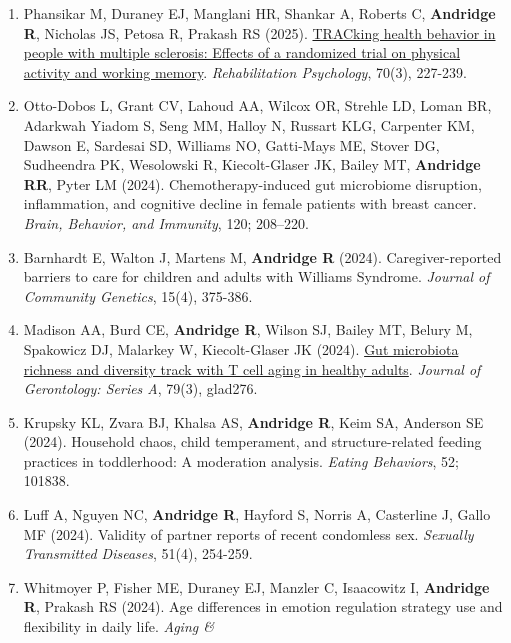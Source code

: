 \documentclass[
  english,
  letterpaper,
  DIV=11,
  numbers=noendperiod]{scrartcl}
\begin{document}
\begin{enumerate}
  \href{https://doi.org/10.1016/j.pedhc.2024.07.003}{Screen time,
  outdoor play, and sleep routines in early childhood: Longitudinal
  associations with parenting stress during toddler years}.
  \emph{Journal of Pediatric Health Care}, 38(6); 794-803.
\item
  Phansikar M, Duraney EJ, Manglani HR, Shankar A, Roberts C,
  \textbf{Andridge R}, Nicholas JS, Petosa R, Prakash RS (2025).
  \href{https://doi.org/10.1037/rep0000578}{TRACking health behavior in
  people with multiple sclerosis: Effects of a randomized trial on
  physical activity and working memory}. \emph{Rehabilitation
  Psychology}, 70(3), 227-239.
\item
  Otto-Dobos L, Grant CV, Lahoud AA, Wilcox OR, Strehle LD, Loman BR,
  Adarkwah Yiadom S, Seng MM, Halloy N, Russart KLG, Carpenter KM,
  Dawson E, Sardesai SD, Williams NO, Gatti-Mays ME, Stover DG,
  Sudheendra PK, Wesolowski R, Kiecolt-Glaser JK, Bailey MT,
  \textbf{Andridge RR}, Pyter LM (2024). Chemotherapy-induced gut
  microbiome disruption, inflammation, and cognitive decline in female
  patients with breast cancer. \emph{Brain, Behavior, and Immunity},
  120; 208--220.
\item
  Barnhardt E, Walton J, Martens M, \textbf{Andridge R} (2024).
  Caregiver-reported barriers to care for children and adults with
  Williams Syndrome. \emph{Journal of Community Genetics}, 15(4),
  375-386.
\item
  Madison AA, Burd CE, \textbf{Andridge R}, Wilson SJ, Bailey MT, Belury
  M, Spakowicz DJ, Malarkey W, Kiecolt-Glaser JK (2024).
  \href{https://doi.org/10.1093/gerona/glad276}{Gut microbiota richness
  and diversity track with T cell aging in healthy adults}.
  \emph{Journal of Gerontology: Series A}, 79(3), glad276.
\item
  Krupsky KL, Zvara BJ, Khalsa AS, \textbf{Andridge R}, Keim SA,
  Anderson SE (2024). Household chaos, child temperament, and
  structure-related feeding practices in toddlerhood: A moderation
  analysis. \emph{Eating Behaviors}, 52; 101838.
\item
  Luff A, Nguyen NC, \textbf{Andridge R}, Hayford S, Norris A,
  Casterline J, Gallo MF (2024). Validity of partner reports of recent
  condomless sex. \emph{Sexually Transmitted Diseases}, 51(4), 254-259.
\item
  Whitmoyer P, Fisher ME, Duraney EJ, Manzler C, Isaacowitz I,
  \textbf{Andridge R}, Prakash RS (2024). Age differences in emotion
  regulation strategy use and flexibility in daily life. \emph{Aging \&
}
\end{enumerate}
\end{document}
